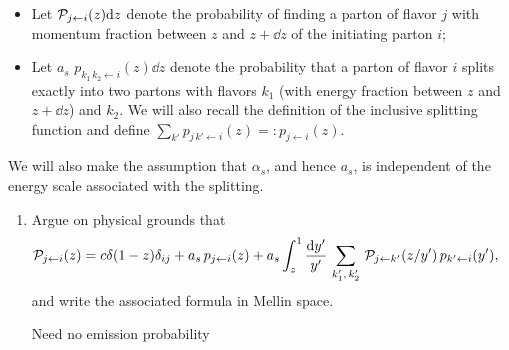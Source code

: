 \begin{problems}
{\begin{itemize}
        \item
            Let \(\mathcal{P}_{j\leftarrow i}(z) \dd z\) denote the probability of finding a parton of flavor \(j\) with momentum fraction between \(z\) and \(z + \dd z\) of the initiating parton \(i\);

        \item
            Let \(a_s\,\,p_{k_1\,k_2 \leftarrow i}(z) \dd z\) denote the probability that a parton of flavor \(i\) splits exactly into two partons with flavors \(k_1\) (with energy fraction between \(z\) and \(z + \dd z\)) and \(k_2\).
            We will also recall the definition of the inclusive splitting function and define \(\sum_{k'} p_{j\,k' \leftarrow i}(z) =: p_{j\leftarrow i}(z)\).
    \end{itemize}

    We will also make the assumption that \(\alpha_s\), and hence \(a_s\), is independent of the energy scale associated with the splitting.


    \begin{enumerate}[label=\roman*)]
        \item
            Argue on physical grounds that
            \begin{align}
                \label{eq:feynman_field_fragmentation_formula}
                \mc P_{j\leftarrow i}(z)
                &=
                c \delta(1-z) \delta_{ij}
                +
                a_s \, p_{j \leftarrow i}(z)
                +
                a_s \int_z^1 \frac{\dd y'}{y'} \, \sum_{k_1',\,k_2'} \,
                    \mc P_{j\leftarrow k'}(z/y')
                    \,
                    p_{k' \leftarrow i}(y')
                ,
            \end{align}
            and write the associated formula in Mellin space.

            {Need no emission probability}


\end{enumerate}}
\end{problems}
